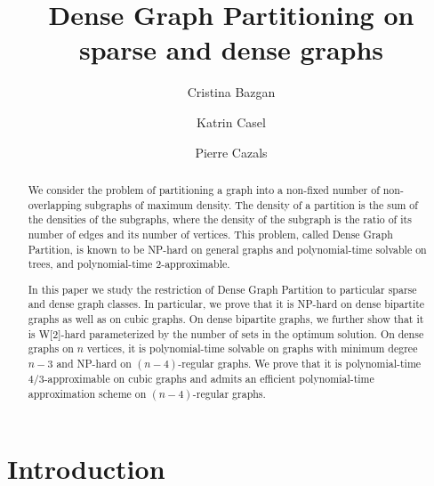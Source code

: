 \documentclass[a4paper,USenglish,cleveref, autoref]{lipics-v2021}
\title{Dense Graph Partitioning on sparse and dense graphs}
\author{Cristina Bazgan}{Universit\'e   Paris-Dauphine, PSL Research University, CNRS,UMR  7243, LAMSADE, 75016 Paris, France}{cristina.bazgan@dauphine.fr}{https://orcid.org/0000-0002-5460-6222}{}
\author{Katrin Casel}{Hasso Plattner Institute, University of Potsdam,  Germany \and \url{https://hpi.de/friedrich/people/katrin-casel.html}}{Katrin.Casel@hpi.de}{https://orcid.org/0000-0001-6146-8684}{}
\author{Pierre Cazals}{Universit\'e   Paris-Dauphine, PSL Research University, CNRS,UMR  7243, LAMSADE, 75016 Paris, France}{pierre.cazals@dauphine.eu}{https://orcid.org/0000-0002-7681-476X}{}
\begin{document}
 \nolinenumbers
\maketitle              

\begin{abstract}
We consider the problem of partitioning a graph into a non-fixed number of  non-overlapping subgraphs of maximum density. The density of a partition is the  sum of the densities of the subgraphs, where the density of the subgraph is  the ratio of its number of edges and its number of vertices. This problem, called Dense Graph Partition, is known to be NP-hard on general graphs and polynomial-time solvable on trees, and polynomial-time  2-approximable.

In this paper we study the restriction of Dense Graph Partition to particular sparse and dense graph classes. In particular, we prove that it is NP-hard on dense bipartite graphs as well as on cubic graphs. On dense bipartite graphs, we further show that it is W[2]-hard parameterized by the number of sets in the optimum solution. On dense graphs on $n$ vertices, it is polynomial-time solvable on graphs with minimum degree $n-3$ and NP-hard on $(n-4)$-regular graphs. We prove that it is  polynomial-time  $4/3$-approximable on cubic graphs and admits an efficient polynomial-time approximation scheme on $(n-4)$-regular graphs. 
\end{abstract}




\section{Introduction}






 
 
\end{document}
